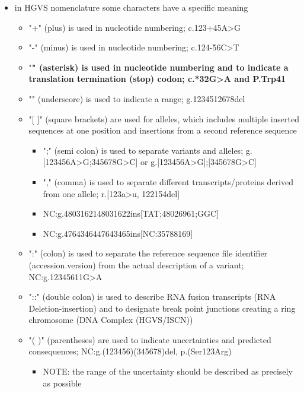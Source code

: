 \documentclass[12pt]{scrartcl}
\begin{document}
\begin{itemize}
\item in HGVS nomenclature some characters have a specific meaning

\begin{itemize}
\item "+" (plus) is used in nucleotide numbering; c.123+45A>G
\item "-" (minus) is used in nucleotide numbering; c.124-56C>T
\item "\textbf{" (asterisk) is used in nucleotide numbering and to indicate a
translation termination (stop) codon; c.*32G>A and P.Trp41}
\item "\textunderscore" (underscore) is used to indicate a range; g.12345\textunderscore12678del
\item "[ ]" (square brackets) are used for alleles, which includes
multiple inserted sequences at one position and insertions from a
second reference sequence
\begin{itemize}
\item ";" (semi colon) is used to separate variants and alleles;
g.[123456A>G;345678G>C] or g.[123456A>G];[345678G>C]
\item "," (comma) is used to separate different transcripts/proteins
derived from one allele; r.[123a>u, 122\textunderscore154del]
\item NC:g.48031621\textunderscore48031622ins[TAT;48026961;GGC]
\item NC:g.47643464\textunderscore47643465ins[NC:35788169]
\end{itemize}
\item ":" (colon) is used to separate the reference sequence file
identifier (accession.version\textunderscorenumber) from the
actual description of a variant;
NC:g.12345611G>A
\item "::" (double colon) is used to describe RNA fusion transcripts
(RNA Deletion-insertion) and to designate break point junctions
creating a ring chromosome (DNA Complex (HGVS/ISCN))
\item "( )" (parentheses) are used to indicate uncertainties and
predicted consequences;
NC:g.(123456)\textunderscore(345678)del, p.(Ser123Arg)
\begin{itemize}
\item NOTE: the range of the uncertainty should be described as precisely as possible

\end{itemize}
\end{itemize}
\end{itemize}
\end{document}
